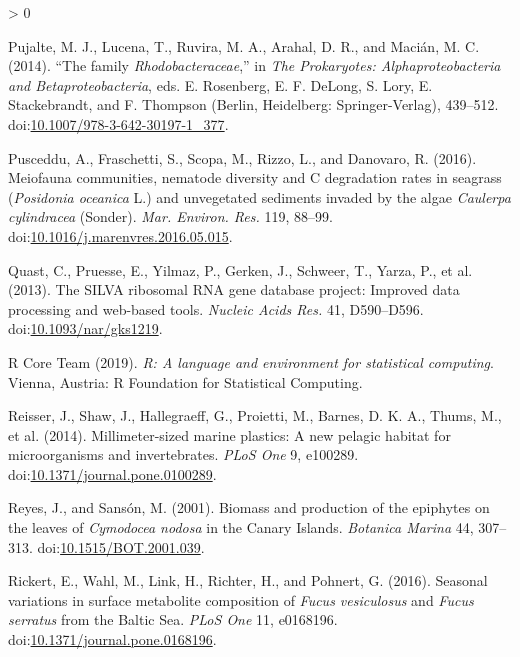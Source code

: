 \documentclass[
  12pt,
]{article}
\newlength{\cslhangindent}
\newenvironment{CSLReferences}[2] %
 {%
  \setlength{\parindent}{0pt}
  \ifodd #1 \everypar{\setlength{\hangindent}{\cslhangindent}}\ignorespaces\fi
  \ifnum #2 > 0
  \setlength{\parskip}{#2\baselineskip}
  \fi
 }%
 {}
\begin{document}
\begin{CSLReferences}{1}{0}
\leavevmode\hypertarget{ref-Pujalte2014}{}%
Pujalte, M. J., Lucena, T., Ruvira, M. A., Arahal, D. R., and Macián, M.
C. (2014). {``The family {\emph{Rhodobacteraceae}},''} in \emph{The
{Prokaryotes}: {Alphaproteobacteria} and {Betaproteobacteria}}, eds. E.
Rosenberg, E. F. DeLong, S. Lory, E. Stackebrandt, and F. Thompson
({Berlin, Heidelberg}: {Springer-Verlag}), 439--512.
doi:\href{https://doi.org/10.1007/978-3-642-30197-1_377}{10.1007/978-3-642-30197-1\_377}.

\leavevmode\hypertarget{ref-Pusceddu2016}{}%
Pusceddu, A., Fraschetti, S., Scopa, M., Rizzo, L., and Danovaro, R.
(2016). Meiofauna communities, nematode diversity and {C} degradation
rates in seagrass ({{\emph{Posidonia oceanica}} L.) and unvegetated
sediments invaded by the algae {\emph{Caulerpa cylindracea}} (Sonder)}.
\emph{Mar. Environ. Res.} 119, 88--99.
doi:\href{https://doi.org/10.1016/j.marenvres.2016.05.015}{10.1016/j.marenvres.2016.05.015}.

\leavevmode\hypertarget{ref-Quast2013}{}%
Quast, C., Pruesse, E., Yilmaz, P., Gerken, J., Schweer, T., Yarza, P.,
et al. (2013). The {SILVA} ribosomal {RNA} gene database project:
Improved data processing and web-based tools. \emph{Nucleic Acids Res.}
41, D590--D596.
doi:\href{https://doi.org/10.1093/nar/gks1219}{10.1093/nar/gks1219}.

\leavevmode\hypertarget{ref-RCoreTeam2019}{}%
R Core Team (2019). \emph{R: {A} language and environment for
statistical computing}. {Vienna, Austria}: {R Foundation for Statistical
Computing}.

\leavevmode\hypertarget{ref-Reisser2014}{}%
Reisser, J., Shaw, J., Hallegraeff, G., Proietti, M., Barnes, D. K. A.,
Thums, M., et al. (2014). Millimeter-sized marine plastics: A new
pelagic habitat for microorganisms and invertebrates. \emph{PLoS One} 9,
e100289.
doi:\href{https://doi.org/10.1371/journal.pone.0100289}{10.1371/journal.pone.0100289}.

\leavevmode\hypertarget{ref-Reyes2001}{}%
Reyes, J., and Sansón, M. (2001). Biomass and production of the
epiphytes on the leaves of {\emph{Cymodocea nodosa}} in the {Canary
Islands}. \emph{Botanica Marina} 44, 307--313.
doi:\href{https://doi.org/10.1515/BOT.2001.039}{10.1515/BOT.2001.039}.

\leavevmode\hypertarget{ref-Rickert2016}{}%
Rickert, E., Wahl, M., Link, H., Richter, H., and Pohnert, G. (2016).
Seasonal variations in surface metabolite composition of {\emph{Fucus
vesiculosus}} and {\emph{Fucus serratus}} from the {Baltic Sea}.
\emph{PLoS One} 11, e0168196.
doi:\href{https://doi.org/10.1371/journal.pone.0168196}{10.1371/journal.pone.0168196}.


\end{CSLReferences}
\end{document}
